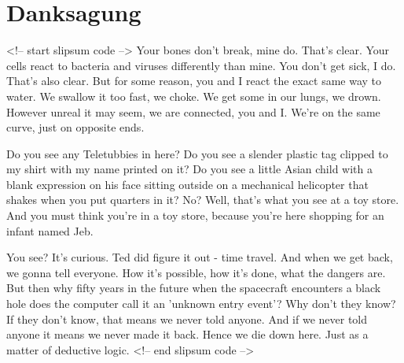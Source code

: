 \chapter{Danksagung}
\thispagestyle{empty}
<!-- start slipsum code -->
Your bones don't break, mine do. That's clear. Your cells react to bacteria and viruses differently than mine. You don't get sick, I do. That's also clear. But for some reason, you and I react the exact same way to water. We swallow it too fast, we choke. We get some in our lungs, we drown. However unreal it may seem, we are connected, you and I. We're on the same curve, just on opposite ends.

Do you see any Teletubbies in here? Do you see a slender plastic tag clipped to my shirt with my name printed on it? Do you see a little Asian child with a blank expression on his face sitting outside on a mechanical helicopter that shakes when you put quarters in it? No? Well, that's what you see at a toy store. And you must think you're in a toy store, because you're here shopping for an infant named Jeb.

You see? It's curious. Ted did figure it out - time travel. And when we get back, we gonna tell everyone. How it's possible, how it's done, what the dangers are. But then why fifty years in the future when the spacecraft encounters a black hole does the computer call it an 'unknown entry event'? Why don't they know? If they don't know, that means we never told anyone. And if we never told anyone it means we never made it back. Hence we die down here. Just as a matter of deductive logic.
<!-- end slipsum code -->